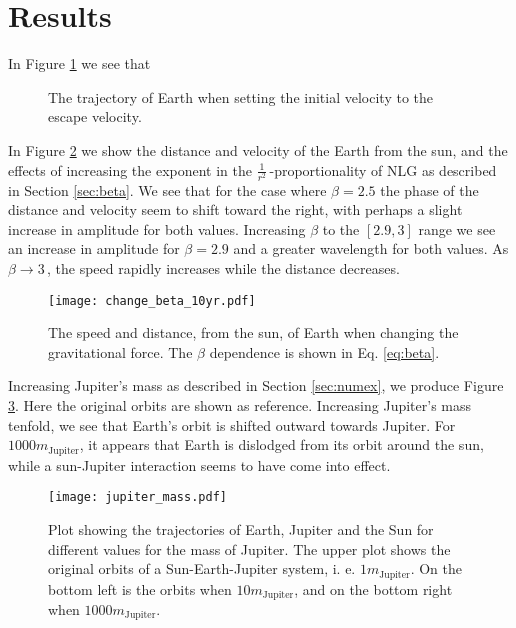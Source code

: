 \section{Results}
\label{sec:results}



In Figure \ref{fig:earth escape} we see that
\begin{figure}[htbp]
	\centering
	\caption{The trajectory of Earth when setting the initial velocity to the escape velocity.}
	\label{fig:earth escape}
\end{figure}

In Figure \ref{fig:changing beta} we show the distance and velocity of the Earth from the sun, and the effects of increasing the exponent in the $\frac{1}{r^2}\,$-proportionality of NLG as described in Section \ref{sec:beta}. We see that for the case where $\beta=2.5$ the phase of the distance and velocity seem to shift toward the right, with perhaps a slight increase in amplitude for both values. Increasing $\beta$ to the $[2.9, 3]$ range we see an increase in amplitude for $\beta = 2.9$ and a greater wavelength for both values. As $\beta \rightarrow 3\,$, the speed rapidly increases while the distance decreases.
\begin{figure}[htbp]
	\centering
	\texttt{[image: change\_beta\_10yr.pdf]}
	\caption{The speed and distance, from the sun, of Earth when changing the gravitational force. The $\beta$ dependence is shown in Eq. \ref{eq:beta}.}
	\label{fig:changing beta}
\end{figure}

Increasing Jupiter's mass as described in Section \ref{sec:numex}, we produce Figure \ref{fig:jupiter mass}. Here the original orbits are shown as reference. Increasing Jupiter's mass tenfold, we see that Earth's orbit is shifted outward towards Jupiter.
For $1000m_{\text{Jupiter}}$, it appears that Earth is dislodged from its orbit around the sun, while a sun-Jupiter interaction seems to have come into effect.
\begin{figure}[htbp]
	\centering
	\texttt{[image: jupiter\_mass.pdf]}
	\caption{Plot showing the trajectories of Earth, Jupiter and the Sun for different values for the mass of Jupiter. The upper plot shows the original orbits of a Sun-Earth-Jupiter system, i. e. $1m_{\text{Jupiter}}$. On the bottom left is the orbits when $10m_{\text{Jupiter}}$, and on the bottom right when $1000m_{\text{Jupiter}}$.}
	\label{fig:jupiter mass}
\end{figure}

